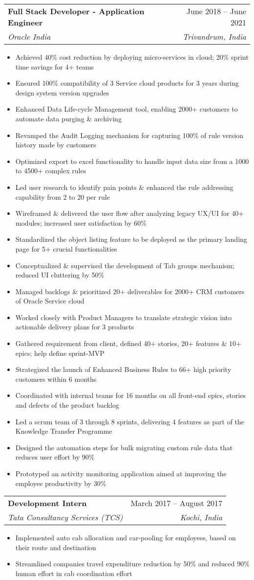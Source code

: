 \documentclass[letterpaper,10pt]{article}
\makeatletter
\newcommand{\resumeItem}[1]{
  \item\small{
    {#1 \vspace{-2pt}}
  }
}
\newcommand{\resumeSubheading}[4]{
  \vspace{-2pt}\item
    \begin{tabular*}{0.97\textwidth}[t]{l@{\extracolsep{\fill}}r}
      \textbf{#1} & #2 \\
      \textit{\small#3} & \textit{\small #4} \\
    \end{tabular*}\vspace{-7pt}
}
\newcommand{\resumeItemListStart}{\begin{itemize}}
\newcommand{\resumeItemListEnd}{\end{itemize}\vspace{-5pt}}
\makeatother
\begin{document}
    \resumeSubheading
      {Full Stack Developer - Application Engineer}{June 2018 -- June 2021}
      {Oracle India}{Trivandrum, India}
      \resumeItemListStart
        	\resumeItem{Achieved 40\% cost reduction by deploying micro-services in cloud; 20\% sprint time savings for 4+ teams}
        	\resumeItem{Ensured 100\% compatibility of 3 Service cloud products for 3 years during design system version upgrades}
        	\resumeItem{Enhanced Data Life-cycle Management tool, enabling 2000+ customers to automate data purging \& archiving}
	\resumeItem{Revamped the Audit Logging mechanism for capturing 100\% of rule version history made by customers}
	\resumeItem{Optimized export to excel functionality to handle input data size from a 1000 to 4500+ complex rules}
	\resumeItem{Led user research to identify pain points \& enhanced the rule addressing capability from 2 to 20 per rule}
	\resumeItem{Wireframed \& delivered the user flow after analyzing legacy UX/UI for 40+ modules; increased user satisfaction by 60\%}
	\resumeItem{Standardized the object listing feature to be deployed as the primary landing page for 5+ crucial functionalities}
	\resumeItem{Conceptualized \& supervised the development of Tab groups mechanism; reduced UI cluttering by 50\%}
\resumeItem{Managed backlogs \& prioritized 20+ deliverables for 2000+ CRM customers of Oracle Service cloud}
	\resumeItem{Worked closely with Product Managers to translate strategic vision into actionable delivery plans for 3 products}
	\resumeItem{Gathered requirement from client, defined 40+ stories, 20+ features \& 10+ epics; help define sprint-MVP}
	\resumeItem{Strategized the launch of Enhanced Business Rules to 66+ high priority customers within 6 months}
	\resumeItem{Coordinated with internal teams for 16 months on all front-end epics, stories and defects of the product backlog}
	\resumeItem{Led a scrum team of 3 through 8 sprints, delivering 4 features as part of the Knowledge Transfer Programme}
	\resumeItem{Designed the automation steps for bulk migrating custom rule data that reduces user effort by 90\%}
	\resumeItem{Prototyped an activity monitoring application aimed at improving the employee productivity by 30\%}



    \resumeItemListEnd

    \resumeSubheading
      {Development Intern}{March 2017 -- August 2017}
      {Tata Consultancy Services (TCS)}{Kochi, India}
      \resumeItemListStart
        \resumeItem{Implemented auto cab allocation and car-pooling for employees, based on their route and destination} 
\resumeItem{Streamlined companies travel expenditure reduction by 50\% and reduced 90\% human effort in cab coordination effort}
      \resumeItemListEnd
\end{document}
